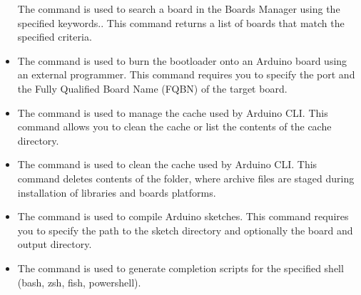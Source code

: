 \begin{itemize}
	The command  is used to search a board in the Boards Manager using the specified keywords.. This command returns a list of boards that match the specified criteria.
	
	
	\item {}
	
	The command  is used to burn the bootloader onto an Arduino board using an external programmer. This command requires you to specify the port and the Fully Qualified Board Name (FQBN) of the target board.
	
	
	
	\item {}
	
	The command  is used to manage the cache used by Arduino CLI. This command allows you to clean the cache or list the contents of the cache directory.
	
	
	\item {}
	
	The command  is used to clean the cache used by Arduino CLI. This command deletes contents of the  folder, where archive files are staged during installation of libraries and boards platforms.
	
	
	\item {}
	
	The command  is used to compile Arduino sketches. This command requires you to specify the path to the sketch directory and optionally the board and output directory.
	
	
	\item {}
	
	The command  is used to generate completion scripts for the specified shell (bash, zsh, fish, powershell).
	
	

\end{itemize}
